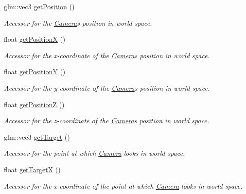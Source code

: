 \begin{DoxyCompactItemize}
glm\+::vec3 \hyperlink{classtsgl_1_1_camera_a21d2c903c077e9a746cd150e2e2bc697}{get\+Position} ()
\begin{DoxyCompactList}\small\item\em Accessor for the \hyperlink{classtsgl_1_1_camera}{Camera}\textquotesingle{}s position in world space. \end{DoxyCompactList}\item 
float \hyperlink{classtsgl_1_1_camera_abd7723919bb264f1e4a9fd666a280c8d}{get\+PositionX} ()
\begin{DoxyCompactList}\small\item\em Accessor for the x-\/coordinate of the \hyperlink{classtsgl_1_1_camera}{Camera}\textquotesingle{}s position in world space. \end{DoxyCompactList}\item 
float \hyperlink{classtsgl_1_1_camera_a14bb7fed2c2772b927dcd9f37807201e}{get\+PositionY} ()
\begin{DoxyCompactList}\small\item\em Accessor for the y-\/coordinate of the \hyperlink{classtsgl_1_1_camera}{Camera}\textquotesingle{}s position in world space. \end{DoxyCompactList}\item 
float \hyperlink{classtsgl_1_1_camera_a73a1acb7ff3a1166e2d6a4be16874219}{get\+PositionZ} ()
\begin{DoxyCompactList}\small\item\em Accessor for the z-\/coordinate of the \hyperlink{classtsgl_1_1_camera}{Camera}\textquotesingle{}s position in world space. \end{DoxyCompactList}\item 
glm\+::vec3 \hyperlink{classtsgl_1_1_camera_a8c6c19acef5dffc6dfc2aff31428d2e1}{get\+Target} ()
\begin{DoxyCompactList}\small\item\em Accessor for the point at which \hyperlink{classtsgl_1_1_camera}{Camera} looks in world space. \end{DoxyCompactList}\item 
float \hyperlink{classtsgl_1_1_camera_ad5778df0178d7926bdb2da22556b03b0}{get\+TargetX} ()
\begin{DoxyCompactList}\small\item\em Accessor for the x-\/coordinate of the point at which \hyperlink{classtsgl_1_1_camera}{Camera} looks in world space. \end{DoxyCompactList}\item 

\end{DoxyCompactItemize}
